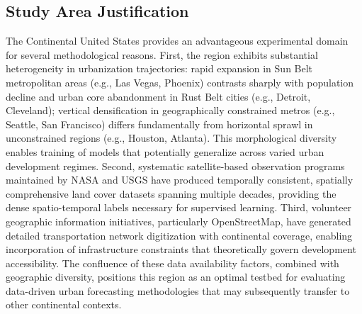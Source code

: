 \documentclass[conference]{IEEEtran}
\begin{document}
\subsection{Study Area Justification}
The Continental United States provides an advantageous experimental domain for several methodological reasons. First, the region exhibits substantial heterogeneity in urbanization trajectories: rapid expansion in Sun Belt metropolitan areas (e.g., Las Vegas, Phoenix) contrasts sharply with population decline and urban core abandonment in Rust Belt cities (e.g., Detroit, Cleveland); vertical densification in geographically constrained metros (e.g., Seattle, San Francisco) differs fundamentally from horizontal sprawl in unconstrained regions (e.g., Houston, Atlanta). This morphological diversity enables training of models that potentially generalize across varied urban development regimes. Second, systematic satellite-based observation programs maintained by NASA and USGS have produced temporally consistent, spatially comprehensive land cover datasets spanning multiple decades, providing the dense spatio-temporal labels necessary for supervised learning. Third, volunteer geographic information initiatives, particularly OpenStreetMap, have generated detailed transportation network digitization with continental coverage, enabling incorporation of infrastructure constraints that theoretically govern development accessibility. The confluence of these data availability factors, combined with geographic diversity, positions this region as an optimal testbed for evaluating data-driven urban forecasting methodologies that may subsequently transfer to other continental contexts.
\end{document}
